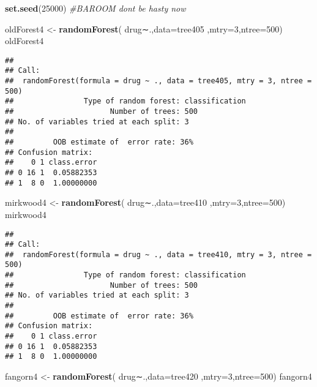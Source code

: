 \documentclass[]{article}
\newenvironment{Shaded}{\begin{snugshade}}{\end{snugshade}}
\newcommand{\KeywordTok}[1]{\textcolor[rgb]{0.13,0.29,0.53}{\textbf{#1}}}
\newcommand{\DataTypeTok}[1]{\textcolor[rgb]{0.13,0.29,0.53}{#1}}
\newcommand{\DecValTok}[1]{\textcolor[rgb]{0.00,0.00,0.81}{#1}}
\newcommand{\StringTok}[1]{\textcolor[rgb]{0.31,0.60,0.02}{#1}}
\newcommand{\CommentTok}[1]{\textcolor[rgb]{0.56,0.35,0.01}{\textit{#1}}}
\newcommand{\NormalTok}[1]{#1}
\begin{document}
\begin{Shaded}
\begin{Highlighting}[]
\KeywordTok{set.seed}\NormalTok{(}\DecValTok{25000}\NormalTok{)}
\CommentTok{#BAROOM dont be hasty now}

\NormalTok{oldForest4 <-}\StringTok{ }\KeywordTok{randomForest}\NormalTok{( drug∼.,}\DataTypeTok{data=}\NormalTok{tree405  ,}\DataTypeTok{mtry=}\DecValTok{3}\NormalTok{,}\DataTypeTok{ntree=}\DecValTok{500}\NormalTok{)}
\NormalTok{oldForest4}
\end{Highlighting}
\end{Shaded}

\begin{verbatim}
## 
## Call:
##  randomForest(formula = drug ~ ., data = tree405, mtry = 3, ntree = 500) 
##                Type of random forest: classification
##                      Number of trees: 500
## No. of variables tried at each split: 3
## 
##         OOB estimate of  error rate: 36%
## Confusion matrix:
##    0 1 class.error
## 0 16 1  0.05882353
## 1  8 0  1.00000000
\end{verbatim}

\begin{Shaded}
\begin{Highlighting}[]
\NormalTok{mirkwood4 <-}\StringTok{ }\KeywordTok{randomForest}\NormalTok{( drug∼.,}\DataTypeTok{data=}\NormalTok{tree410  ,}\DataTypeTok{mtry=}\DecValTok{3}\NormalTok{,}\DataTypeTok{ntree=}\DecValTok{500}\NormalTok{)}
\NormalTok{mirkwood4}
\end{Highlighting}
\end{Shaded}

\begin{verbatim}
## 
## Call:
##  randomForest(formula = drug ~ ., data = tree410, mtry = 3, ntree = 500) 
##                Type of random forest: classification
##                      Number of trees: 500
## No. of variables tried at each split: 3
## 
##         OOB estimate of  error rate: 36%
## Confusion matrix:
##    0 1 class.error
## 0 16 1  0.05882353
## 1  8 0  1.00000000
\end{verbatim}

\begin{Shaded}
\begin{Highlighting}[]
\NormalTok{fangorn4 <-}\StringTok{ }\KeywordTok{randomForest}\NormalTok{( drug∼.,}\DataTypeTok{data=}\NormalTok{tree420  ,}\DataTypeTok{mtry=}\DecValTok{3}\NormalTok{,}\DataTypeTok{ntree=}\DecValTok{500}\NormalTok{)}
\NormalTok{fangorn4}
\end{Highlighting}
\end{Shaded}
\end{document}

